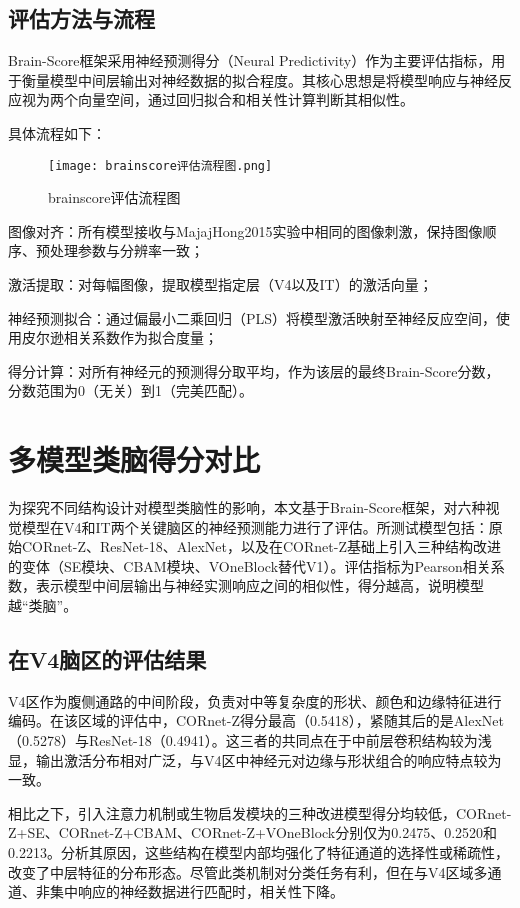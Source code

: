 \subsection{评估方法与流程}

Brain-Score框架采用神经预测得分（Neural Predictivity）作为主要评估指标，用于衡量模型中间层输出对神经数据的拟合程度。其核心思想是将模型响应与神经反应视为两个向量空间，通过回归拟合和相关性计算判断其相似性。

具体流程如下：

\begin{figure}[hbt]
	\centering
	\texttt{[image: brainscore评估流程图.png]}
	\caption{brainscore评估流程图}
	\label{f.brainscore评估流程图}
\end{figure}

图像对齐：所有模型接收与MajajHong2015实验中相同的图像刺激，保持图像顺序、预处理参数与分辨率一致；

激活提取：对每幅图像，提取模型指定层（V4以及IT）的激活向量；

神经预测拟合：通过偏最小二乘回归（PLS）将模型激活映射至神经反应空间，使用皮尔逊相关系数作为拟合度量；

得分计算：对所有神经元的预测得分取平均，作为该层的最终Brain-Score分数，分数范围为0（无关）到1（完美匹配）。

\section{多模型类脑得分对比}

为探究不同结构设计对模型类脑性的影响，本文基于Brain-Score框架，对六种视觉模型在V4和IT两个关键脑区的神经预测能力进行了评估。所测试模型包括：原始CORnet-Z、ResNet-18、AlexNet，以及在CORnet-Z基础上引入三种结构改进的变体（SE模块、CBAM模块、VOneBlock替代V1）。评估指标为Pearson相关系数，表示模型中间层输出与神经实测响应之间的相似性，得分越高，说明模型越“类脑”。

\subsection{在V4脑区的评估结果}

V4区作为腹侧通路的中间阶段，负责对中等复杂度的形状、颜色和边缘特征进行编码。在该区域的评估中，CORnet-Z得分最高（0.5418），紧随其后的是AlexNet（0.5278）与ResNet-18（0.4941）。这三者的共同点在于中前层卷积结构较为浅显，输出激活分布相对广泛，与V4区中神经元对边缘与形状组合的响应特点较为一致。

相比之下，引入注意力机制或生物启发模块的三种改进模型得分均较低，CORnet-Z+SE、CORnet-Z+CBAM、CORnet-Z+VOneBlock分别仅为0.2475、0.2520和0.2213。分析其原因，这些结构在模型内部均强化了特征通道的选择性或稀疏性，改变了中层特征的分布形态。尽管此类机制对分类任务有利，但在与V4区域多通道、非集中响应的神经数据进行匹配时，相关性下降。

